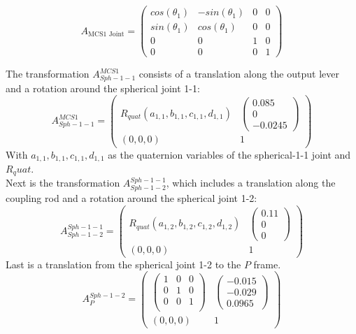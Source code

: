 \documentclass[12pt,a4paper]{article}
\begin{document}
\begin{equation}
    A_{\text{MCS1 Joint}} = 
    \begin{pmatrix}
        cos(\theta_1) & -sin(\theta_1)& 0 & 0\\
        sin(\theta_1)&  cos(\theta_1)& 0 & 0 \\
        0 & 0 & 1 & 0 \\
        0 & 0 & 0 & 1
    \end{pmatrix}
\end{equation}

The transformation $A_{Sph-1-1}^{MCS1}$ consists of a translation along the output lever and a rotation around the spherical joint 1-1:
\begin{equation}
        A_{Sph-1-1}^{MCS1} =
        \begin{pmatrix}
        R_{quat}(a_{1,1},b_{1,1},c_{1,1},d_{1,1}) & \begin{pmatrix} 0.085 \\0 \\-0.0245 \end{pmatrix}\\
        (0, 0, 0)& 1
        \end{pmatrix}
\end{equation}
With $a_{1,1},b_{1,1},c_{1,1},d_{1,1}$ as the quaternion variables of the spherical-1-1 joint and $R_quat$.\\

Next is the transformation $A_{Sph-1-2}^{Sph-1-1}$, which includes a translation along the coupling rod and a rotation around the spherical joint 1-2:
\begin{equation}
    A_{Sph-1-2}^{Sph-1-1}
    =
    \begin{pmatrix}
        R_{quat}(a_{1,2},b_{1,2},c_{1,2},d_{1,2}) & \begin{pmatrix} 0.11 \\0 \\0 \end{pmatrix}\\
        (0, 0, 0)& 1
        \end{pmatrix}
\end{equation}
Last is a translation from the spherical joint 1-2 to the $P$ frame.
\begin{equation}
    A_{P}^{Sph-1-2}
    =
    \begin{pmatrix}
        \begin{pmatrix}
        1&0&0\\
        0&1&0 \\
        0&0&1\\
        \end{pmatrix} 
        & 
        \begin{pmatrix} -0.015 \\-0.029 \\0.0965 \end{pmatrix}\\
        (0, 0, 0)& 1
        \end{pmatrix}
\end{equation}
\end{document}
